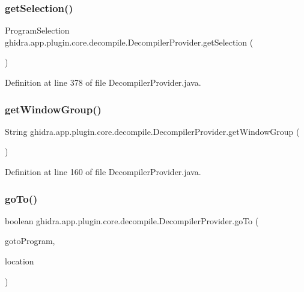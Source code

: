 \subsubsection{\texorpdfstring{getSelection()}{getSelection()}}
{\footnotesize\ttfamily Program\+Selection ghidra.\+app.\+plugin.\+core.\+decompile.\+Decompiler\+Provider.\+get\+Selection (\begin{DoxyParamCaption}{ }\end{DoxyParamCaption})\hspace{0.3cm}{\ttfamily [inline]}}



Definition at line 378 of file Decompiler\+Provider.\+java.

\mbox{\label{classghidra_1_1app_1_1plugin_1_1core_1_1decompile_1_1_decompiler_provider_ad8024deb2b67ffdb4b70e4dcab3d8bee}} 
\subsubsection{\texorpdfstring{getWindowGroup()}{getWindowGroup()}}
{\footnotesize\ttfamily String ghidra.\+app.\+plugin.\+core.\+decompile.\+Decompiler\+Provider.\+get\+Window\+Group (\begin{DoxyParamCaption}{ }\end{DoxyParamCaption})\hspace{0.3cm}{\ttfamily [inline]}}



Definition at line 160 of file Decompiler\+Provider.\+java.

\mbox{\label{classghidra_1_1app_1_1plugin_1_1core_1_1decompile_1_1_decompiler_provider_abc292f1da8451745af1bdeb21b005d81}} 
\subsubsection{\texorpdfstring{goTo()}{goTo()}}
{\footnotesize\ttfamily boolean ghidra.\+app.\+plugin.\+core.\+decompile.\+Decompiler\+Provider.\+go\+To (\begin{DoxyParamCaption}\item[{Program}]{goto\+Program,  }\item[{Program\+Location}]{location }\end{DoxyParamCaption})\hspace{0.3cm}{\ttfamily [inline]}}



